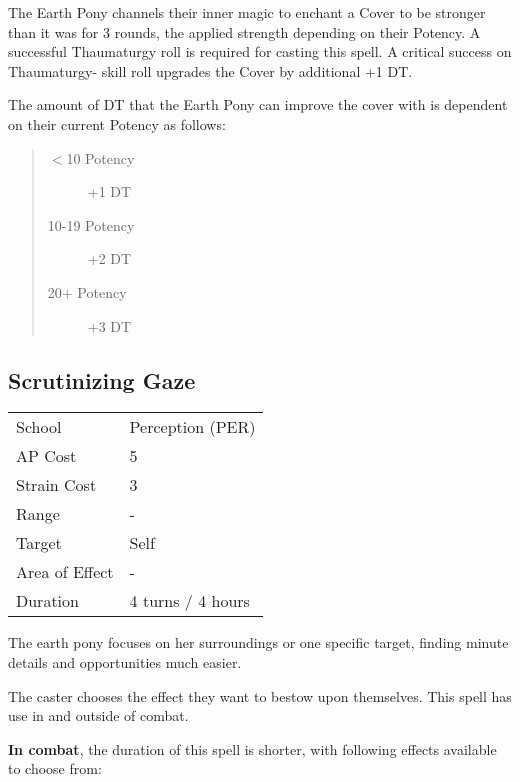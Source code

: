 \documentclass[11pt,a4paper,twocolumn]{book}
\begin{document}
The Earth Pony channels their inner magic to enchant a Cover to be stronger than it was for 3 rounds, the applied strength depending on their Potency. A successful Thaumaturgy roll is required for casting this spell. A critical success on Thaumaturgy- skill roll upgrades the Cover by additional +1 DT.

The amount of DT that the Earth Pony can improve the cover with is dependent on their current Potency as follows:

\begin{quote}
	\begin{description}
		\item[$<$10 Potency] 	+1 DT
		\item[10-19 Potency] 	+2 DT
		\item[20+ Potency] 	+3 DT
	\end{description}
\end{quote}

\vfill

\subsection*{Scrutinizing Gaze}
{
	\begin{tabu} to 75mm{| X[l,4] | X[l,7] |}
		\hline
		School 			& Perception (PER) 	\\
		AP Cost	      	& 5 				\\
		Strain Cost     & 3 				\\
		Range     		& - 	\\
		Target      	& Self				\\
		Area of Effect  & - 	 		\\
		Duration     	& 4 turns / 4 hours 				\\ \hline
	\end{tabu}
	
}

\medskip

The earth pony focuses on her surroundings or one specific target, finding minute details and opportunities much easier.

The caster chooses the effect they want to bestow upon themselves. This spell has use in and outside of combat.

\medskip

\textbf{In combat}, the duration of this spell is shorter, with following effects available to choose from:
\end{document}
